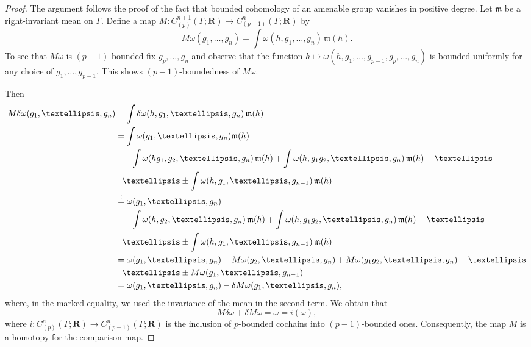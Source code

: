 \documentclass[10pt,a4paper]{amsart}
\newcommand{\B}[1]{{\mathbf #1}}
\newcommand{\F}[1]{{\mathfrak #1}}
\begin{document}
\begin{proof}
The argument follows the proof of the fact that bounded cohomology
of an amenable group vanishes in positive degree.
Let $\F m$ be a right-invariant mean on $\Gamma$.  Define a map
$M \colon C^{n+1}_{(p)}(\Gamma;\B R)\to C^n_{(p-1)}(\Gamma;\B R)$ by
$$
M\omega(g_1,\dots,g_n)=\int\omega(h,g_1,\dots,g_n)\,\F m(h).
$$
To see that $M\omega$ is $(p-1)$-bounded fix $g_p,\ldots,g_n$ and
observe that the function
$h\mapsto \omega(h,g_1,\ldots,g_{p-1},g_p,\ldots,g_n)$
is bounded uniformly for any choice of $g_1,\ldots,g_{p-1}$. 
This shows $(p-1)$-boundedness of $M\omega$.

Then
\begin{align*}
M\delta\omega(g_1,\dots,g_n)
&=\int\delta\omega(h,g_1,\dots,g_n)\,\F m(h)\\
&=\int\omega(g_1,\dots,g_n)\F m(h)\\
&\hphantom{=}-\int\omega(hg_1,g_2,\dots,g_n)\,\F m(h)+\int\omega(h,g_1g_2,\dots,g_n)\,\F m(h)-\dots\\
&\hphantom{=}\dots\pm \int\omega(h,g_1,\ldots,g_{n-1})\,\F m(h)\\
&\overset{!}=\omega(g_1,\dots,g_n)\\
&\hphantom{=}-\int\omega(h,g_2,\dots,g_n)\,\F m(h)+\int\omega(h,g_1g_2,\dots,g_n)\,\F m(h)-\dots\\
&\hphantom{=}\dots\pm \int\omega(h,g_1,\ldots,g_{n-1})\,\F m(h)\\
&=\omega(g_1,\dots,g_n)-M\omega(g_2,\dots,g_n)+M\omega(g_1g_2,\dots,g_n)-\dots\\
&\hphantom{=}\dots\pm M\omega(g_1,\ldots,g_{n-1})\\
&=\omega(g_1,\dots,g_n)-\delta M\omega(g_1,\dots,g_n),
\end{align*}
where, in the marked equality, we used the invariance of the mean 
in the second term.
We obtain that
$$
M\delta\omega+\delta M\omega=\omega=i(\omega),
$$
where $i\colon C^n_{(p)}(\Gamma;\B R)\to C^n_{(p-1)}(\Gamma;\B R)$ is the inclusion
of $p$-bounded cochains into $(p-1)$-bounded ones.
Consequently, the map $M$ is a homotopy for the comparison map.
\end{proof}
\end{document}
